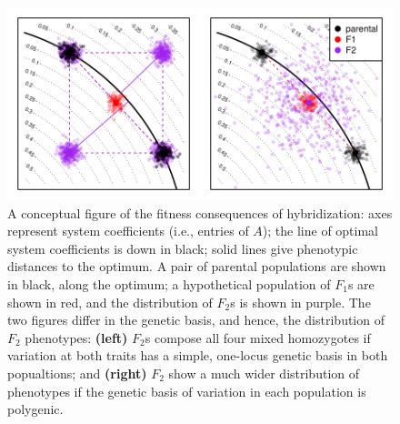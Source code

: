 \documentclass{article}
\newcommand{\1}{\mathbbm{1}}
\begin{document}
\begin{figure}[H]
\centering
\includegraphics{figures/conceptual_fig}
\caption{
    \label{fig:conceptual_fig}
    A conceptual figure of the fitness consequences of hybridization:
    axes represent system coefficients (i.e., entries of $A$);
    the line of optimal system coefficients is down in black;
    solid lines give phenotypic distances to the optimum.
    A pair of parental populations are shown in black, along the optimum;
    a hypothetical population of $F_1$s are shown in red,
    and the distribution of $F_2$s is shown in purple.
    The two figures differ in the genetic basis, and hence,
    the distribution of $F_2$ phenotypes:
    \textbf{(left)}
    $F_2$s compose all four mixed homozygotes if variation at both
    traits has a simple, one-locus genetic basis in both popualtions; and
    \textbf{(right)}
    $F_2$ show a much wider distribution of phenotypes
    if the genetic basis of variation in each population is polygenic.
}
\end{figure}
\end{document}
